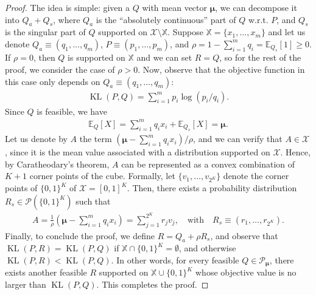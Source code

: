 \documentclass{article}
\theoremstyle{plain}
\theoremstyle{definition}
\newcommand{\lrp}[1]{\left( #1 \right)}
\newcommand{\KL}{\operatorname{KL}}
\newcommand{\calP}{\mathcal P}
\newcommand{\calX}{\mathcal X}
\newcommand{\qtext}[1]{\quad \text{#1} \quad}
\newcommand{\boldmu}{\boldsymbol{\mu}}
\newcommand{\finitesupport}{\mathbb{X}}
\begin{document}
\begin{proof}
    The idea is simple: given a $Q$ with mean vector $\boldmu$, we can decompose it into $Q_a + Q_s$, where $Q_a$ is the ``absolutely continuous'' part of $Q$ w.r.t. $P$, and $Q_s$ is the singular part of $Q$ supported on $\calX \setminus \finitesupport$. Suppose $\finitesupport = \{x_1, \ldots, x_m\}$ and let us denote $Q_a \equiv (q_1, \ldots, q_m)$, $P \equiv (p_1, \ldots, p_m)$, and $\rho = 1- \sum_{i=1}^m q_i = \mathbb{E}_{Q_s}[1] \geq 0$. If $\rho=0$, then $Q$ is supported on $\finitesupport$ and we can set $R=Q$, so for the rest of the proof, we consider the case of $\rho>0$. Now, observe that the objective function in this case only depends on $Q_a \equiv (q_1, \ldots, q_m)$: 
    \begin{align}
        \KL(P, Q) = \sum_{i=1}^m p_i \log (p_i/q_i). 
    \end{align}
    Since $Q$ is feasible, we have 
    \begin{align}
        \mathbb{E}_Q[X] = \sum_{i=1}^m q_i x_i + \mathbb{E}_{Q_s}[X] = \boldmu. 
    \end{align}
    Let us denote by $A$ the term $(\boldmu - \sum_{i=1}^m q_i x_i)/\rho$, and we can verify that $A \in \calX$,  since it is the mean value associated with a distribution supported on $\calX$. Hence, by Caratheodary's theorem, $A$ can be represented as a convex combination of $K+1$ corner points of the cube. Formally, let $\{v_1, \ldots, v_{2^K}\}$ denote the corner points of $\{0, 1\}^K$ of $\calX = [0,1]^K$. Then, there exists a probability distribution $R_s \in \calP(\{0,1\}^K)$ such that 
    \begin{align}
        A = \frac{1}{\rho}\lrp{\boldmu - \sum_{i=1}^m q_i x_i} = \sum_{j=1}^{2^K} r_j v_j, \qtext{with} R_s \equiv (r_1, \ldots, r_{2^K}). 
    \end{align}
    Finally, to conclude the proof, we define $R = Q_a + \rho R_s$, and observe that $\KL(P, R) = \KL(P, Q)$ if $\finitesupport \cap \{0, 1\}^K = \emptyset$, and otherwise $\KL(P, R) < \KL(P, Q)$.  In other words, for every feasible $Q \in \calP_{\boldmu}$, there exists another feasible $R$ supported on $\finitesupport \cup\{0,1\}^K$ whose objective value is no larger than $\KL(P, Q)$. This completes the proof. 
\end{proof}
\end{document}
